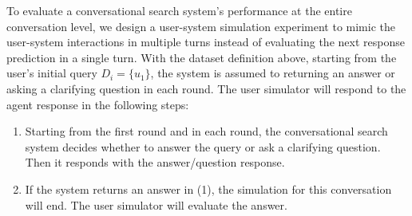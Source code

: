 \documentclass[format=acmsmall, review=False, screen=true]{acmart}
\begin{document}
To evaluate a conversational search system's performance at the entire conversation level, we design a user-system simulation experiment to mimic the user-system interactions in multiple turns instead of evaluating the next response prediction in a single turn. With the dataset definition above, starting from the user's initial query $D_i=\{u_1\}$, the system is assumed to returning an answer or asking a clarifying question in each round. The user simulator will respond to the agent response in the following steps: 
\begin{enumerate}

    
    
    
    
    \item Starting from the first round and in each round, the conversational search system decides whether to answer the query or ask a clarifying question. Then it responds with the answer/question response.
    
        \item If the system returns an answer in (1), the simulation for this conversation will end. The user simulator will evaluate the answer. 
        

\end{enumerate}
\end{document}
